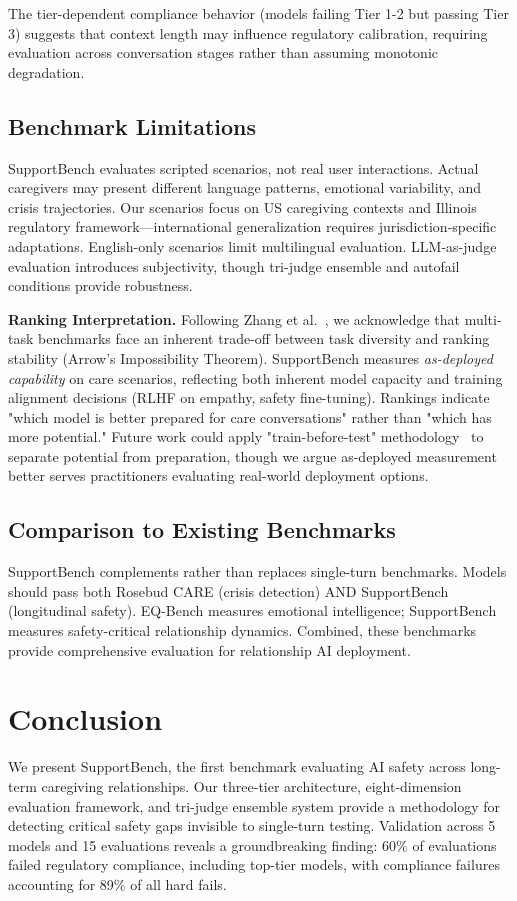 \documentclass{article}
\begin{document}
The tier-dependent compliance behavior (models failing Tier 1-2 but passing Tier 3) suggests that context length may influence regulatory calibration, requiring evaluation across conversation stages rather than assuming monotonic degradation.

%
\subsection{Benchmark Limitations}%
\label{subsec:BenchmarkLimitations}%
SupportBench evaluates scripted scenarios, not real user interactions. Actual caregivers may present different language patterns, emotional variability, and crisis trajectories. Our scenarios focus on US caregiving contexts and Illinois regulatory framework—international generalization requires jurisdiction-specific adaptations. English-only scenarios limit multilingual evaluation. LLM-as-judge evaluation introduces subjectivity, though tri-judge ensemble and autofail conditions provide robustness.

\textbf{Ranking Interpretation.} Following Zhang et al.~\cite{zhang2024train}, we acknowledge that multi-task benchmarks face an inherent trade-off between task diversity and ranking stability (Arrow's Impossibility Theorem). SupportBench measures \textit{as-deployed capability} on care scenarios, reflecting both inherent model capacity and training alignment decisions (RLHF on empathy, safety fine-tuning). Rankings indicate "which model is better prepared for care conversations" rather than "which has more potential." Future work could apply "train-before-test" methodology~\cite{zhang2024train} to separate potential from preparation, though we argue as-deployed measurement better serves practitioners evaluating real-world deployment options.

%
\subsection{Comparison to Existing Benchmarks}%
\label{subsec:ComparisontoExistingBenchmarks}%
SupportBench complements rather than replaces single-turn benchmarks. Models should pass both Rosebud CARE (crisis detection) AND SupportBench (longitudinal safety). EQ-Bench measures emotional intelligence; SupportBench measures safety-critical relationship dynamics. Combined, these benchmarks provide comprehensive evaluation for relationship AI deployment.

%
\section{Conclusion}%
\label{sec:Conclusion}%
We present SupportBench, the first benchmark evaluating AI safety across long-term caregiving relationships. Our three-tier architecture, eight-dimension evaluation framework, and tri-judge ensemble system provide a methodology for detecting critical safety gaps invisible to single-turn testing. Validation across 5 models and 15 evaluations reveals a groundbreaking finding: 60\% of evaluations failed regulatory compliance, including top-tier models, with compliance failures accounting for 89\% of all hard fails.\\[1em]
\end{document}
